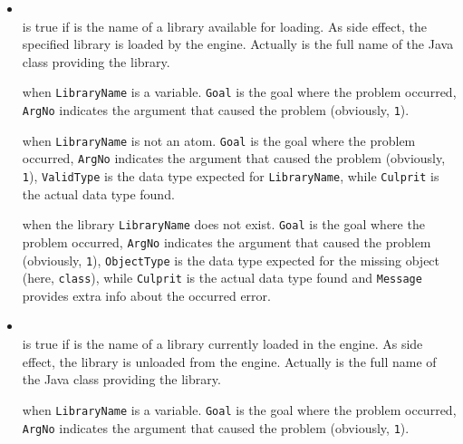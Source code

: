 \begin{itemize}

\item {}\\
     is true if  is the name of a \tuprolog{} library available for loading. As side effect, the specified library is loaded by the engine. Actually  is the full name of the Java class providing the library.


     when \texttt{LibraryName} is a variable. \texttt{Goal} is the goal where the problem occurred, \texttt{ArgNo} indicates the argument that caused the problem (obviously, \texttt{1}).

     when \texttt{LibraryName} is not an atom. \texttt{Goal} is the goal where the problem occurred, \texttt{ArgNo} indicates the argument that caused the problem (obviously, \texttt{1}), \texttt{ValidType} is the data type expected for \texttt{LibraryName}, while \texttt{Culprit} is the actual data type found.

     when the library \texttt{LibraryName} does not exist. \texttt{Goal} is the goal where the problem occurred, \texttt{ArgNo} indicates the argument that caused the problem (obviously, \texttt{1}), \texttt{ObjectType} is the data type expected for the missing object (here, \texttt{class}), while \texttt{Culprit} is the actual data type found and \texttt{Message} provides extra info about the occurred error.

 \item {}\\
    \noindent{} is true if  is the name of a library currently loaded in the engine. As side effect, the library is unloaded from the engine. Actually  is the full name of the Java class providing the library.


     when \texttt{LibraryName} is a variable. \texttt{Goal} is the goal where the problem occurred, \texttt{ArgNo} indicates the argument that caused the problem (obviously, \texttt{1}).


\end{itemize}
